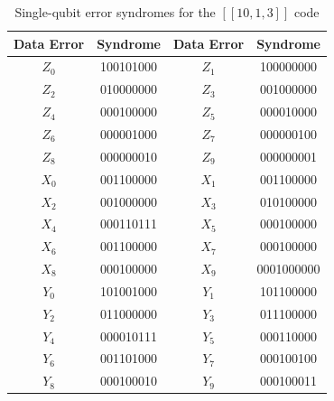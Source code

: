 \documentclass[reprint, amsmath,amssymb, aps,pra,
 floatfix,
]{revtex4-2}
\newcommand{\PadCell}[1]{\kern8pt#1\kern8pt}
\newcommand{\PadCellColor}[2]{\cellcolor{#1}\kern8pt#2\kern8pt}
\begin{document}
\begin{table}[h]
\centering
\scriptsize
  \setlength{\tabcolsep}{0pt} %
  \renewcommand{\arraystretch}{1.4} %

  \begin{tabular}{|c|c|c|c|}
    \hline
    \textbf{Data Error}  & \textbf{ Syndrome } & \textbf{ Data Error } & \textbf{ Syndrome } \\ \hline


    \rowcolor{gray!10}
    $Z_0$  & 100101000  & $Z_1$    &  100000000      \\ \hline
    $Z_2$  & 010000000  & $Z_3$    &  001000000      \\ \hline

    \rowcolor{gray!10}
    $Z_4$  & 000100000  & $Z_5$    &  000010000      \\ \hline
    $Z_6$  & 000001000  & $Z_7$    &  000000100      \\ \hline

    \rowcolor{gray!10}
    $Z_8$  & 000000010  & $Z_9$ & 000000001 \\ \hline
    $X_0$  &  001100000   & $X_1$  & 001100000    \\ \hline

    \rowcolor{gray!10}
       $X_2$  &  001000000 &   $X_3$  & 010100000   \\ \hline
        $X_4$    & 000110111  &  $X_5$  & 000100000       \\ \hline
     

    \rowcolor{gray!10}
     $X_6$ &  001100000   &   $X_7$  & 000100000  \\ \hline
     $X_8$    &  000100000  & $X_9$ & 0001000000    \\ \hline
   
    \rowcolor{gray!10}
     $Y_0$  & 101001000  & $Y_1$    &  101100000      \\ \hline
    $Y_2$  & 011000000  & $Y_3$    &  011100000      \\ \hline
    

    \rowcolor{gray!10}
    $Y_4$  & 000010111  & $Y_5$    &  000110000     \\ \hline
    $Y_6$  & 001101000  & $Y_7$    &   000100100     \\ \hline
    
    \rowcolor{gray!10}
    $Y_8$  & 000100010  &     $Y_9$  & 000100011      \\ \hline


   

  \end{tabular}
\caption{Single-qubit error syndromes for the $[[10,1,3]]$ code}
\label{tab:errors_due_to_faults_10_1}
\end{table}
\end{document}
